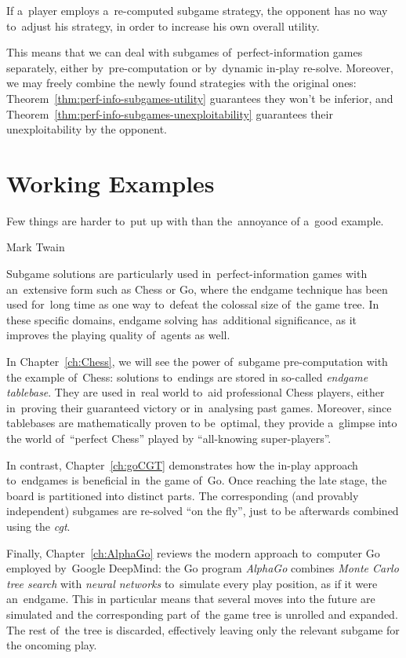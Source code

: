 \begin{cor}
  If a~player employs a~re-computed subgame strategy, the opponent has no way to~adjust his strategy, in order to increase his own overall utility.
\end{cor}

This means that we can deal with subgames of~perfect-information games separately, either by~pre-computation or by~dynamic in-play re-solve.
Moreover, we may freely combine the newly found strategies with the original ones:
Theorem~\ref{thm:perf-info-subgames-utility} guarantees they won't be inferior, and Theorem~\ref{thm:perf-info-subgames-unexploitability} guarantees their unexploitability by the opponent.


\section{Working Examples}
\epigraph{
  Few things are harder to~put up with than the~annoyance of a~good example.
}{Mark Twain}
Subgame solutions are particularly used in~perfect-information games with an~extensive form such as Chess or Go, where the endgame technique has been used for~long time as one way to~defeat the colossal size of~the game tree.
In these specific domains, endgame solving has~additional significance, as it improves the playing quality of~agents as well.

In Chapter~\ref{ch:Chess}, we will see the power of~subgame pre-computation with the example of~Chess:
solutions to~endings are stored in so-called \emph{endgame tablebase}.
They are used in~real world to~aid professional Chess players, either in~proving their guaranteed victory or in~analysing past games.
Moreover, since tablebases are mathematically proven to be~optimal, they provide a~glimpse into the world of~``perfect Chess'' played by ``all-knowing super-players''.

In contrast, Chapter~\ref{ch:goCGT} demonstrates how the in-play approach to~endgames is beneficial in~the game of~Go.
Once reaching the late stage, the board is partitioned into distinct parts.
The corresponding (and provably independent) subgames are re-solved ``on the fly'', just to be afterwards combined using the \emph{\acrlong{cgt}}.

Finally, Chapter~\ref{ch:AlphaGo} reviews the modern approach to~computer Go employed by~Google DeepMind:
the Go program \emph{AlphaGo} combines \emph{Monte Carlo tree search} with \emph{neural networks} to~simulate every play position, as if it were an~endgame.
This in particular means that several moves into the future are simulated and the corresponding part of~the game tree is unrolled and expanded.
The rest of~the tree is discarded, effectively leaving only the relevant subgame for the oncoming play.
